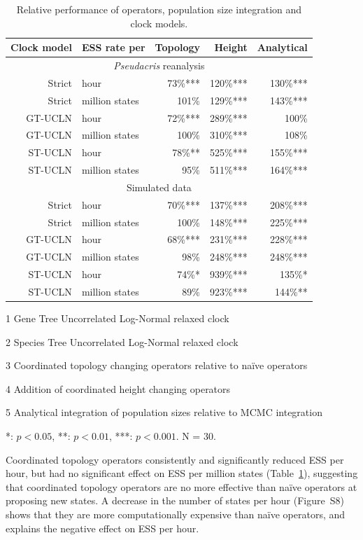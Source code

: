 \documentclass[nogrid]{MBE}%
\begin{document}
\begin{table}[htb!]
\caption{Relative performance of operators, population size integration and clock models.}
\label{tab:convergenceLM}
\begin{threeparttable}
\begin{tabular*}{\textwidth}{@{\extracolsep{\fill}}rlrrr@{}}
\hline
Clock model & ESS rate per & Topology\tnote{3} & Height\tnote{4} & Analytical\tnote{5}\tabularnewline
\hline
\multicolumn{5}{c}{\textit{Pseudacris} reanalysis}\tabularnewline
\hline
Strict & hour & 73\%{***} & 120\%{***} & 130\%{***}\tabularnewline
Strict & million states & 101\%\hphantom{***} & 129\%{***} & 143\%{***}\tabularnewline
GT-UCLN\tnote{1} & hour & 72\%{***} & 289\%{***} & 100\%\hphantom{***}\tabularnewline
GT-UCLN & million states & 100\%\hphantom{***} & 310\%{***} & 108\%\hphantom{***}\tabularnewline
ST-UCLN\tnote{2} & hour & 78\%{**}\hphantom{*} & 525\%{***} & 155\%{***}\tabularnewline
ST-UCLN & million states & 95\%\hphantom{***} & 511\%{***} & 164\%{***}\tabularnewline
\hline
\multicolumn{5}{c}{Simulated data}\tabularnewline
\hline
Strict & hour & 70\%{***} & 137\%{***} & 208\%{***}\tabularnewline
Strict & million states & 100\%\hphantom{***} & 148\%{***} & 225\%{***}\tabularnewline
GT-UCLN & hour & 68\%{***} & 231\%{***} & 228\%{***}\tabularnewline
GT-UCLN & million states & 98\%\hphantom{***} & 248\%{***} & 248\%{***}\tabularnewline
ST-UCLN & hour & 74\%{*}\hphantom{**} & 939\%{***} & 135\%{*}\hphantom{**}\tabularnewline
ST-UCLN & million states & 89\%\hphantom{***} & 923\%{***} & 144\%{**}\hphantom{*}\tabularnewline
\hline
\end{tabular*}
\begin{tablenotes}
\item[1] Gene Tree Uncorrelated Log-Normal relaxed clock
\item[2] Species Tree Uncorrelated Log-Normal relaxed clock
\item[3] Coordinated topology changing operators relative to na\"ive operators
\item[4] Addition of coordinated height changing operators
\item[5] Analytical integration of population sizes relative to MCMC integration
\item {*}: $p < 0.05$, {**}: $p < 0.01$, {***}: $p < 0.001$. N = 30.
\end{tablenotes}
\end{threeparttable}
\end{table}

Coordinated topology operators consistently and significantly reduced ESS
per hour, but had no significant effect on ESS per million states
(Table~\ref{tab:convergenceLM}), suggesting that coordinated topology
operators are no more effective than na\"ive operators at proposing new
states. A decrease in the number of states per hour (Figure~S8) shows that
they are more computationally expensive than na\"ive operators, and explains
the negative effect on ESS per hour.
\end{document}
